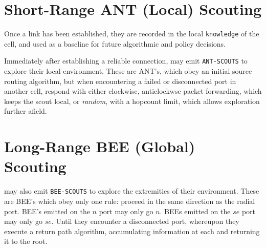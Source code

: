 \section{Short-Range ANT (Local)  Scouting}

Once a link has been established, they are recorded in the local \texttt{knowledge} of the cell, and used as a baseline for future algorithmic and policy decisions. 

Immediately after establishing a reliable connection, \CELLs may emit \texttt{ANT-SCOUTS} to explore their local environment. These are ANT's, which obey an initial source routing algorithm, but when encountering a failed or disconnected port in another cell, respond with either clockwise, anticlockwse packet forwarding, which keeps the scout local, or \emph{random}, with a hopcount limit, which allows exploration further afield.

\section{Long-Range BEE (Global)  Scouting}

\CELLs may also emit \texttt{BEE-SCOUTS} to explore the extremities of their environment. These are BEE's which obey only one rule: proceed in the same direction as the radial port.   BEE's  emitted on the $n$ port may only go $n$.  BEEs emitted on the $se$ port may only go $se$. Until they encounter a disconnected port, whereupon they execute a return path algorithm, accumulating information at each \CELL and returning it to the root.

